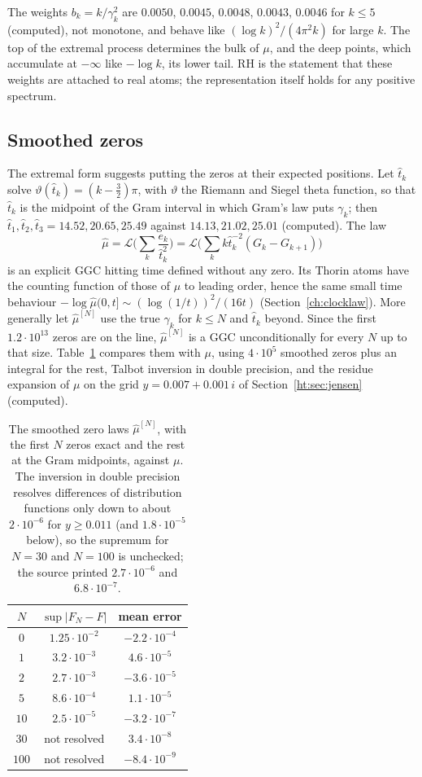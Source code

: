 The weights $b_k=k/\gamma_k^2$ are $0.0050$, $0.0045$, $0.0048$, $0.0043$, $0.0046$ for $k\le5$ (computed), not monotone, and behave like $(\log k)^2/(4\pi^2k)$ for large $k$. The top of the extremal process determines the bulk of $\mu$, and the deep points, which accumulate at $-\infty$ like $-\log k$, its lower tail. RH is the statement that these weights are attached to real atoms; the representation itself holds for any positive spectrum.

\subsection{Smoothed zeros}
The extremal form suggests putting the zeros at their expected positions. Let $\hat t_k$ solve $\vartheta(\hat t_k)=(k-\frac32)\pi$, with $\vartheta$ the Riemann and Siegel theta function, so that $\hat t_k$ is the midpoint of the Gram interval in which Gram's law puts $\gamma_k$; then $\hat t_1,\hat t_2,\hat t_3=14.52,20.65,25.49$ against $14.13,21.02,25.01$ (computed). The law
\[
\hat\mu=\mathcal L\Big(\sum_k\frac{e_k}{\hat t_k^2}\Big)=\mathcal L\Big(\sum_kk\hat t_k^{-2}(G_k-G_{k+1})\Big)
\]
is an explicit GGC hitting time defined without any zero. Its Thorin atoms have the counting function of those of $\mu$ to leading order, hence the same small time behaviour $-\log\hat\mu(0,t]\sim(\log(1/t))^2/(16t)$ (Section~\ref{ch:clocklaw}). More generally let $\hat\mu^{[N]}$ use the true $\gamma_k$ for $k\le N$ and $\hat t_k$ beyond. Since the first $1.2\cdot10^{13}$ zeros are on the line, $\hat\mu^{[N]}$ is a GGC unconditionally for every $N$ up to that size. Table~\ref{ht:tab:smooth} compares them with $\mu$, using $4\cdot10^5$ smoothed zeros plus an integral for the rest, Talbot inversion in double precision, and the residue expansion of $\mu$ on the grid $y=0.007+0.001\,i$ of Section~\ref{ht:sec:jensen} (computed).

\begin{table}[ht]
\centering\footnotesize
\begin{tabular}{ccc}
\toprule
$N$ & $\sup|F_N-F|$ & mean error \\
\midrule
$0$ & $1.25\cdot10^{-2}$ & $-2.2\cdot10^{-4}$ \\
$1$ & $3.2\cdot10^{-3}$ & $4.6\cdot10^{-5}$ \\
$2$ & $2.7\cdot10^{-3}$ & $-3.6\cdot10^{-5}$ \\
$5$ & $8.6\cdot10^{-4}$ & $1.1\cdot10^{-5}$ \\
$10$ & $2.5\cdot10^{-5}$ & $-3.2\cdot10^{-7}$ \\
$30$ & not resolved & $3.4\cdot10^{-8}$ \\
$100$ & not resolved & $-8.4\cdot10^{-9}$ \\
\bottomrule
\end{tabular}
\caption{The smoothed zero laws $\hat\mu^{[N]}$, with the first $N$ zeros exact and the rest at the Gram midpoints, against $\mu$. The inversion in double precision resolves differences of distribution functions only down to about $2\cdot10^{-6}$ for $y\ge0.011$ (and $1.8\cdot10^{-5}$ below), so the supremum for $N=30$ and $N=100$ is unchecked; the source printed $2.7\cdot10^{-6}$ and $6.8\cdot10^{-7}$.}\label{ht:tab:smooth}
\end{table}

